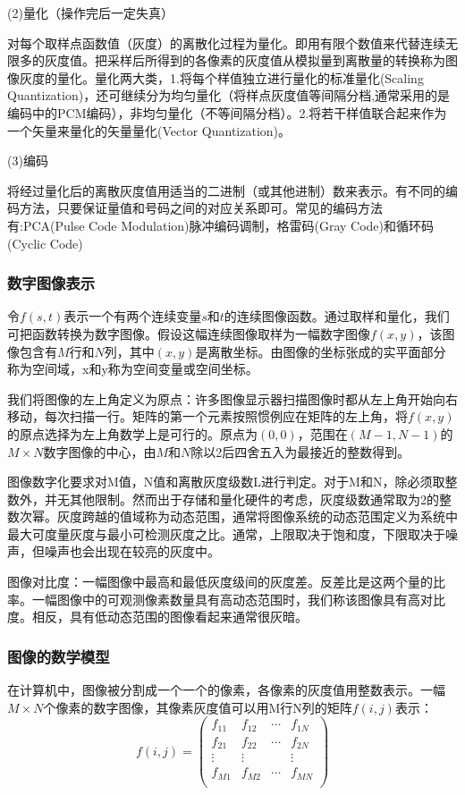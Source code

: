 \documentclass[11pt]{article}
\begin{document}
(2)量化（操作完后一定失真）

对每个取样点函数值（灰度）的离散化过程为量化。即用有限个数值来代替连续无限多的灰度值。把采样后所得到的各像素的灰度值从模拟量到离散量的转换称为图像灰度的量化。量化两大类，1.将每个样值独立进行量化的标准量化(Scaling Quantization)，还可继续分为均匀量化（将样点灰度值等间隔分档,通常采用的是编码中的PCM编码），非均匀量化（不等间隔分档）。2.将若干样值联合起来作为一个矢量来量化的矢量量化(Vector Quantization)。

(3)编码

将经过量化后的离散灰度值用适当的二进制（或其他进制）数来表示。有不同的编码方法，只要保证量值和号码之间的对应关系即可。常见的编码方法有:PCA(Pulse Code Modulation)脉冲编码调制，格雷码(Gray Code)和循环码(Cyclic Code)
\subsubsection{数字图像表示}
令$f(s,t)$表示一个有两个连续变量$s$和$t$的连续图像函数。通过取样和量化，我们可把函数转换为数字图像。假设这幅连续图像取样为一幅数字图像$f(x,y)$，该图像包含有$M$行和$N$列，其中$(x,y)$是离散坐标。由图像的坐标张成的实平面部分称为空间域，x和y称为空间变量或空间坐标。

我们将图像的左上角定义为原点：许多图像显示器扫描图像时都从左上角开始向右移动，每次扫描一行。矩阵的第一个元素按照惯例应在矩阵的左上角，将$f(x,y)$的原点选择为左上角数学上是可行的。原点为$(0,0)$，范围在$(M-1,N-1)$的$M\times N$数字图像的中心，由$M$和$N$除以2后四舍五入为最接近的整数得到。

图像数字化要求对M值，N值和离散灰度级数L进行判定。对于M和N，除必须取整数外，并无其他限制。然而出于存储和量化硬件的考虑，灰度级数通常取为2的整数次幂。灰度跨越的值域称为动态范围，通常将图像系统的动态范围定义为系统中最大可度量灰度与最小可检测灰度之比。通常，上限取决于饱和度，下限取决于噪声，但噪声也会出现在较亮的灰度中。

图像对比度：一幅图像中最高和最低灰度级间的灰度差。反差比是这两个量的比率。一幅图像中的可观测像素数量具有高动态范围时，我们称该图像具有高对比度。相反，具有低动态范围的图像看起来通常很灰暗。
\subsubsection{图像的数学模型}
在计算机中，图像被分割成一个一个的像素，各像素的灰度值用整数表示。一幅$M\times N$个像素的数字图像，其像素灰度值可以用M行N列的矩阵$f(i,j)$表示：
$$f(i,j) = \begin{pmatrix}
	f_{11}& f_{12} & \cdots & f_{1N}\\
	f_{21}& f_{22} & \cdots & f_{2N}\\
	\vdots & \vdots & & \vdots\\
	f_{M1}& f_{M2} & \cdots & f_{MN}\\
\end{pmatrix}$$
\end{document}
